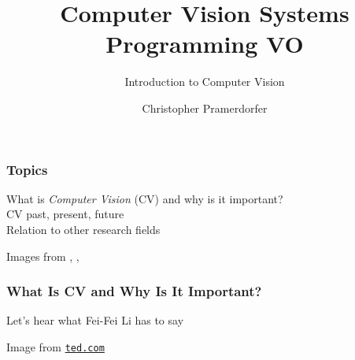 \documentclass[xetex,professionalfont]{beamer}
\title{Computer Vision Systems Programming VO}
\subtitle{Introduction to Computer Vision}
\author{Christopher Pramerdorfer}
\institute{Computer Vision Lab, Vienna University of Technology}
\begin{document}

\begin{frame}
\maketitle
\end{frame}


\begin{frame}
\frametitle{Topics}

What is \emph{Computer Vision} (CV) and why is it important?\\\medskip
CV past, present, future\\\medskip
Relation to other research fields

\bigskip
\begin{center}
    {\centering Images from \cite{lecun1989}, \cite{shotton2011}, \cite{taigman2013}}
\end{center}

\end{frame}


\begin{frame}
\frametitle{What Is CV and Why Is It Important?}

Let's hear what Fei-Fei Li has to say

\bigskip
\begin{center}
    {\centering Image from \href{https://www.ted.com/talks/fei_fei_li_how_we_re_teaching_computers_to_understand_pictures}{\texttt{ted.com}}}
\end{center}

\end{frame}
\end{document}
